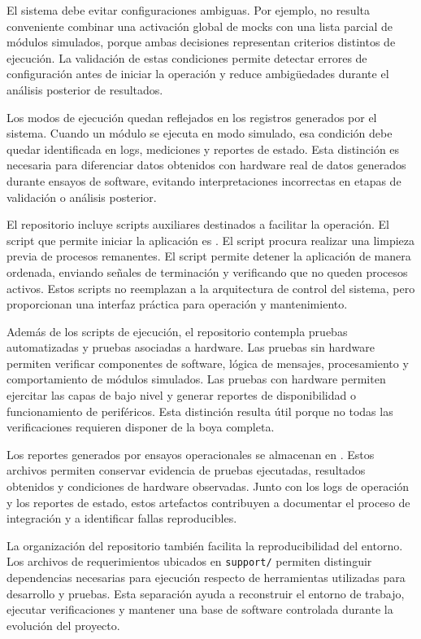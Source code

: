 El sistema debe evitar configuraciones ambiguas. Por ejemplo, no resulta conveniente combinar una activación global de mocks con una lista parcial de módulos simulados, porque ambas decisiones representan criterios distintos de ejecución. La validación de estas condiciones permite detectar errores de configuración antes de iniciar la operación y reduce ambigüedades durante el análisis posterior de resultados.

Los modos de ejecución quedan reflejados en los registros generados por el sistema. Cuando un módulo se ejecuta en modo simulado, esa condición debe quedar identificada en logs, mediciones y reportes de estado. Esta distinción es necesaria para diferenciar datos obtenidos con hardware real de datos generados durante ensayos de software, evitando interpretaciones incorrectas en etapas de validación o análisis posterior.

El repositorio incluye scripts auxiliares destinados a facilitar la operación. El script que permite iniciar la aplicación es \texttt{}. El script procura realizar una limpieza previa de procesos remanentes. El script \texttt{} permite detener la aplicación de manera ordenada, enviando señales de terminación y verificando que no queden procesos activos. Estos scripts no reemplazan a la arquitectura de control del sistema, pero proporcionan una interfaz práctica para operación y mantenimiento.

Además de los scripts de ejecución, el repositorio contempla pruebas automatizadas y pruebas asociadas a hardware. Las pruebas sin hardware permiten verificar componentes de software, lógica de mensajes, procesamiento y comportamiento de módulos simulados. Las pruebas con hardware permiten ejercitar las capas de bajo nivel y generar reportes de disponibilidad o funcionamiento de periféricos. Esta distinción resulta útil porque no todas las verificaciones requieren disponer de la boya completa.

Los reportes generados por ensayos operacionales se almacenan en \texttt{}. Estos archivos permiten conservar evidencia de pruebas ejecutadas, resultados obtenidos y condiciones de hardware observadas. Junto con los logs de operación y los reportes de estado, estos artefactos contribuyen a documentar el proceso de integración y a identificar fallas reproducibles.

La organización del repositorio también facilita la reproducibilidad del entorno. Los archivos de requerimientos ubicados en \texttt{support/} permiten distinguir dependencias necesarias para ejecución respecto de herramientas utilizadas para desarrollo y pruebas. Esta separación ayuda a reconstruir el entorno de trabajo, ejecutar verificaciones y mantener una base de software controlada durante la evolución del proyecto.

